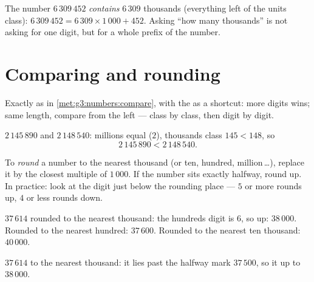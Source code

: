\begin{example}\label{ex:g4:numbers:contained}
The number $6\,309\,452$ \emph{contains} $6\,309$ thousands
(everything left of the units class): $6\,309\,452 = 6\,309 \times
1\,000 + 452$. Asking ``how many thousands'' is not asking for one
digit, but for a whole prefix of the number.
\end{example}

\section{Comparing and rounding}

\begin{method}\label{met:g4:numbers:compare}
Exactly as in \cref{met:g3:numbers:compare}, with the  as a
shortcut: more digits wins; same length, compare from the left ---
class by class, then digit by digit.
\end{method}

\begin{example}\label{ex:g4:numbers:compare}
$2\,145\,890$ and $2\,148\,540$: millions equal ($2$), thousands
class $145 < 148$, so
\[
2\,145\,890 < 2\,148\,540 .
\]
\end{example}

\begin{definition}[Rounding]\label{def:g4:numbers:round}
To \emph{round} a number to the nearest thousand
(or ten, hundred, million\,\dots), replace it by the closest multiple
of $1\,000$. If the number sits exactly halfway, round up. In
practice: look at the digit just below the rounding place --- $5$ or
more rounds up, $4$ or less rounds down.
\end{definition}

\begin{example}\label{ex:g4:numbers:round}
$37\,614$ rounded to the nearest thousand: the hundreds digit is
$6$, so  up: $38\,000$. Rounded to the nearest hundred:
$37\,600$. Rounded to the nearest ten thousand: $40\,000$.
\end{example}

\begin{omfigure}

{\small {} $37\,614$ to the nearest thousand: it lies past the
halfway mark $37\,500$, so it  up to $38\,000$.}
\end{omfigure}

